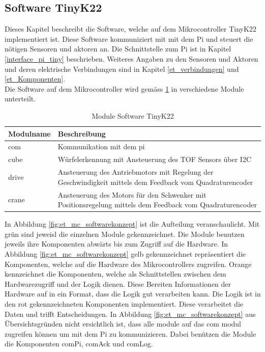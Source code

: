 \documentclass[../../main.tex]{subfiles}
\begin{document}
    \subsection{Software TinyK22} \label{et_software_tiny}
    Dieses Kapitel beschreibt die Software, welche auf dem Mikrocontroller TinyK22 implementiert ist. Diese Software kommuniziert mit mit dem Pi und steuert die nötigen Sensoren und aktoren an. Die Schnittstelle zum Pi ist in Kapitel \ref{interface_pi_tiny} beschrieben. Weiteres Angaben zu den Sensoren und Aktoren und deren elektrische Verbindungen sind in Kapitel \ref{et_verbindungen} und \ref{et_Komponenten}.\\
    Die Software auf dem Mikrocontroller wird gemäss \ref{tab:et_mc_softwarekonzept} in verschiedene Module unterteilt.\\

    \begin{table}[H]
        \centering
        \begin{tabular}{|l|p{12cm}|}
        \hline
        \textbf{Modulname} & \textbf{Beschreibung}    \\ \hline
        com   & Kommunikation mit dem pi                                                                                 \\ \hline
        cube  & Würfelerkennung mit Ansteuerung des TOF Sensors über I2C                                                 \\ \hline
        drive & Ansteuerung des Antriebmotors mit Regelung der Geschwindigkeit mittels dem Feedback vom Quadraturencoder \\ \hline
        crane & Ansteuerung des Motors für den Schwenker mit Positionsregelung mittels dem Feedback vom Quadraturencoder \\ \hline
        \end{tabular}
        \caption{Module Software TinyK22}
        \label{tab:et_mc_softwarekonzept}
        \end{table}


    In Abbildung \ref{fig:et_mc_softwarekonzept} ist die Aufteilung veranschaulicht. Mit grün sind jeweisl die einzelnen Module gekennzeichnet. Die Module benutzen jeweils ihre Komponenten abwärts bis zum Zugriff auf die Hardware. In Abbildung \ref{fig:et_mc_softwarekonzept} gelb gekennzeichnet repräsentiert die Komponenten, welche auf die Hardware des Mikrocontrollers zugreifen. Orange kennzeichnet die Komponenten, welche als Schnittstellen zwischen dem Hardwarezugriff und der Logik dienen. Diese Bereiten Informationen der Hardware auf in ein Format, dass die Logik gut verarbeiten kann. Die Logik ist in den rot gekennzeichneten Komponenten implementiert. Diese verarbeitet die Daten und trifft Entscheidungen.
    In Abbildung \ref{fig:et_mc_softwarekonzept} aus Übersichtsgründen nicht ersichtlich ist, dass alle module auf das com modul zugreifen können um mit dem Pi zu kommunizieren. Dabei benützen die Module die Komponenten comPi, comAck und comLog.\\
\end{document}
